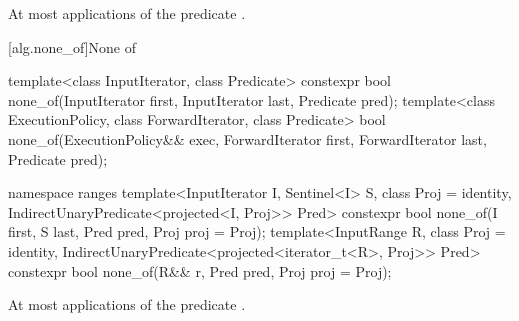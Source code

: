 \begin{itemdescr}
\pnum
{}

\pnum
{}


\pnum
\complexity At most  applications of the predicate
.
\end{itemdescr}

[alg.none_of]{None of}

%
\begin{itemdecl}
template<class InputIterator, class Predicate>
  constexpr bool none_of(InputIterator first, InputIterator last, Predicate pred);
template<class ExecutionPolicy, class ForwardIterator, class Predicate>
  bool none_of(ExecutionPolicy&& exec, ForwardIterator first, ForwardIterator last,
               Predicate pred);
\end{itemdecl}\begin{addedblock}\begin{itemdecl}
namespace ranges {
  template<InputIterator I, Sentinel<I> S, class Proj = identity,
      IndirectUnaryPredicate<projected<I, Proj>> Pred>
    constexpr bool none_of(I first, S last, Pred pred, Proj proj = Proj{});
  template<InputRange R, class Proj = identity,
      IndirectUnaryPredicate<projected<iterator_t<R>, Proj>> Pred>
    constexpr bool none_of(R&& r, Pred pred, Proj proj = Proj{});
}
\end{itemdecl}\end{addedblock}

\begin{itemdescr}
\pnum
{}

\pnum
{}


\pnum
\complexity At most  applications of the predicate
.
\end{itemdescr}

